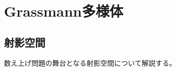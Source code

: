 \documentclass{ltjsreport}
\begin{document}
\section{Grassmann多様体}
  \subsection{射影空間}  

  数え上げ問題の舞台となる射影空間について解説する。
  
\end{document}
